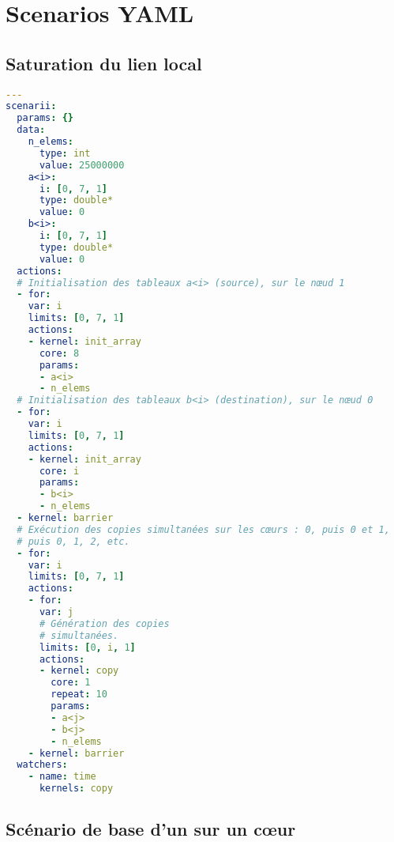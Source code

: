 

\chapter{Scenarios YAML}\label{chap:annexe:tool}
\mtcaddchapter
\chaptertoc

\section{Saturation du lien local}\label{chap:annexe:tool:bp}
\begin{lstlisting}[language=yaml,caption=Scénario de saturation du lien groupe entre le nœud 0 et le nœud 1 avec 8 copies simultanées,label=lst:annexe:tool:bp]
---
scenarii:
  params: {}
  data:
    n_elems:
      type: int
      value: 25000000
    a<i>:
      i: [0, 7, 1]
      type: double*
      value: 0
    b<i>:
      i: [0, 7, 1]
      type: double*
      value: 0
  actions:
  # Initialisation des tableaux a<i> (source), sur le nœud 1
  - for:
    var: i
    limits: [0, 7, 1]
    actions:
    - kernel: init_array
      core: 8
      params:
      - a<i>
      - n_elems
  # Initialisation des tableaux b<i> (destination), sur le nœud 0
  - for:
    var: i
    limits: [0, 7, 1]
    actions:
    - kernel: init_array
      core: i
      params:
      - b<i>
      - n_elems
  - kernel: barrier
  # Exécution des copies simultanées sur les cœurs : 0, puis 0 et 1,
  # puis 0, 1, 2, etc.
  - for:
    var: i
    limits: [0, 7, 1]
    actions:
    - for:
      var: j
      # Génération des copies
      # simultanées.
      limits: [0, i, 1]
      actions:
      - kernel: copy
        core: 1
        repeat: 10
        params:
        - a<j>
        - b<j>
        - n_elems
    - kernel: barrier
  watchers:
    - name: time
      kernels: copy
\end{lstlisting}

\section{Scénario de base d'un \gemm sur un cœur}\label{chap:annexe:tool:dgemm-base}

